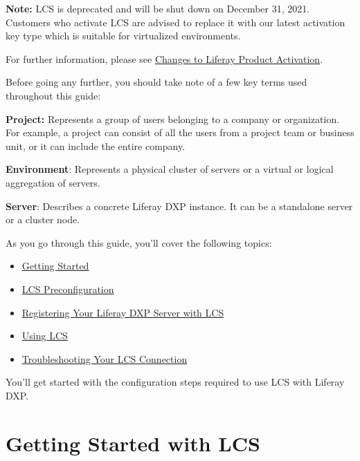 \noindent\hrulefill

\textbf{Note:} LCS is deprecated and will be shut down on December 31,
2021. Customers who activate LCS are advised to replace it with our
latest activation key type which is suitable for virtualized
environments.

For further information, please see
\href{https://help.liferay.com/hc/en-us/articles/4402347960845-Changes-to-Liferay-Product-Activation}{Changes
to Liferay Product Activation}.

\noindent\hrulefill

Before going any further, you should take note of a few key terms used
throughout this guide:

\textbf{Project:} Represents a group of users belonging to a company or
organization. For example, a project can consist of all the users from a
project team or business unit, or it can include the entire company.

\textbf{Environment}: Represents a physical cluster of servers or a
virtual or logical aggregation of servers.

\textbf{Server}: Describes a concrete Liferay DXP instance. It can be a
standalone server or a cluster node.

As you go through this guide, you'll cover the following topics:

\begin{itemize}
\tightlist
\item
  \href{/docs/7-2/deploy/-/knowledge_base/d/getting-started-with-lcs}{Getting
  Started}
\item
  \href{/docs/7-2/deploy/-/knowledge_base/d/lcs-preconfiguration}{LCS
  Preconfiguration}
\item
  \href{/docs/7-2/deploy/-/knowledge_base/d/activating-your-liferay-dxp-server-with-lcs}{Registering
  Your Liferay DXP Server with LCS}
\item
  \href{/docs/7-2/deploy/-/knowledge_base/d/using-lcs}{Using LCS}
\item
  \href{/docs/7-2/deploy/-/knowledge_base/d/troubleshooting-your-lcs-connection}{Troubleshooting
  Your LCS Connection}
\end{itemize}

You'll get started with the configuration steps required to use LCS with
Liferay DXP.

\chapter{Getting Started with LCS}\label{getting-started-with-lcs}

